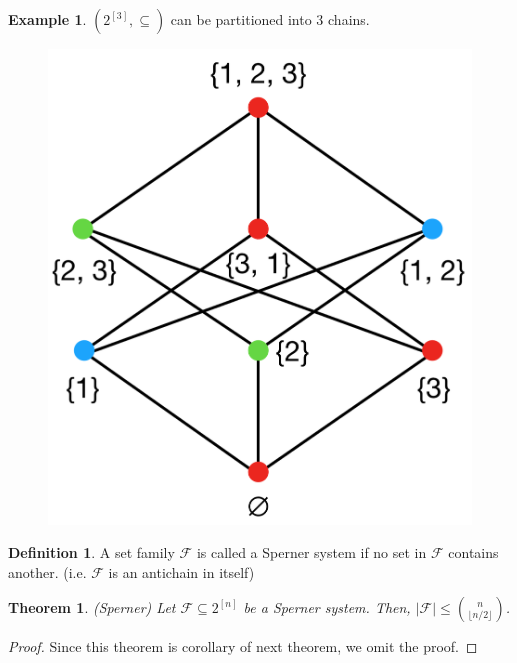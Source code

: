 \documentclass[11pt]{article}
\newtheorem{theorem}{Theorem}
\theoremstyle{definition}
\newtheorem{definition}{Definition}
\newtheorem{example}{Example}
\begin{document}
	\begin{example}
		$(2^{[3]}, \subseteq)$ can be partitioned into 3 chains.
		\begin{figure}[H]
			\begin{center}
				\includegraphics[scale= 0.25]{Fig01.png}
			\end{center}
		\end{figure}
	\end{example}
	
	\begin{definition}
		A set family $\mathcal{F}$ is called a Sperner system if no set in $\mathcal{F}$ contains another.
		(i.e. $\mathcal{F}$ is an antichain in itself)
	\end{definition}
	
	\begin{theorem}(Sperner)
		Let $\mathcal{F} \subseteq 2^{[n]}$ be a Sperner system. Then, $|\mathcal{F}| \leq {n \choose \lfloor n/2 \rfloor}$.
	\end{theorem}
	
	\begin{proof}
		Since this theorem is corollary of next theorem, we omit the proof.
	\end{proof}
	
\end{document}
